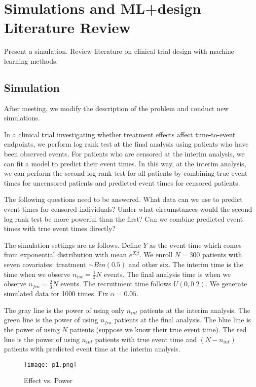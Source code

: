 \documentclass[12pt]{article}
\begin{document}
\section{Simulations and ML+design Literature Review}

Present a simulation. Review literature on clinical trial design with
machine learning methods. 

\subsection{Simulation}

After meeting, we modify the description of the problem and conduct
new simulations.

In a clinical trial investigating whether treatment effects affect
time-to-event endpoints, we perform log rank test at the final
analysis using patients who have been observed events. For patients
who are censored at the interim analysis, we can fit a model to
predict their event times. In this way, at the interim analysis, we
can perform the second log rank test for all patients by combining
true event times for uncensored patients and predicted event times for
censored patients.

The following questions need to be answered. What data can we use to
predict event times for censored individuals? Under what circumstances
would the second log rank test be more powerful than the first? Can we
combine predicted event times with true event times directly?

The simulation settings are as follows.  Define $Y$ as the event time
which comes from exponential distribution with mean $e^{X \beta}$. We
enroll $N=300$ patients with seven covariates: treatment $\sim
Bin(0.5)$ and other six. The interim time is the time when we observe
$n_{int} = \frac{1}{3}N$ events. The final analysis time is when we
observe $n_{fin} = \frac{2}{3}N$ events. The recruitment time follows
$U(0,0.2)$.  We generate simulated data for 1000 times. Fix
$\alpha=0.05$.

The gray line is the power of using only $n_{int}$ patients at the
interim analysis. The green line is the power of using $n_{fin}$
patients at the final analysis. The blue line is the power of using
$N$ patients (suppose we know their true event time). The red line is
the power of using $n_{int}$ patients with true event time and
$(N-n_{int})$ patients with predicted event time at the interim
analysis.

\begin{figure}[!ht]
\centering
\texttt{[image: p1.png]}
\caption{Effect vs. Power}
\label{fig:effect}
\end{figure}
\end{document}
